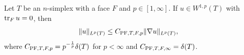 \documentclass[10pt,letterpaper]{article}
\begin{document}
\begin{lemma}\label{lemma:mixedbconsimplex}
    Let $T$ be an $n$-simplex with a face $F$ and $p \in [1,\infty]$. 
    If $u \in W^{1,p}(T)$ with $\operatorname{tr}_{F} u = 0$, then 
    \begin{align*}
        \| u \|_{L^{p}(T)}
        &
        \leq 
        C_{{\rm PF},T,F,p} \| \nabla u \|_{L^{p}(T)}
        ,
    \end{align*}
    where $C_{{\rm PF},T,F,p} = p^{-\frac 1 p} {\delta}(T)$ for $p < \infty$ and $C_{{\rm PF},T,F,\infty} = {\delta}(T)$. 
\end{lemma}
\end{document}
